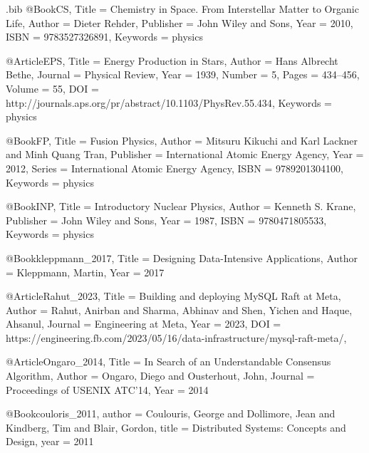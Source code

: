 \RequirePackage{filecontents}
\begin{filecontents*}{\jobname.bib}
@Book{CS,
  Title                    = {Chemistry in Space. From Interstellar Matter to Organic Life},
  Author                   = {Dieter Rehder},
  Publisher                = {John Wiley and Sons},
  Year                     = {2010},
  ISBN                     = {9783527326891},
  Keywords                 = {physics}
}

@Article{EPS,
  Title                    = {Energy Production in Stars},
  Author                   = {Hans Albrecht Bethe},
  Journal                  = {Physical Review},
  Year                     = {1939},
  Number                   = {5},
  Pages                    = {434--456},
  Volume                   = {55},
  DOI                      = {http://journals.aps.org/pr/abstract/10.1103/PhysRev.55.434},
  Keywords                 = {physics}
}

@Book{FP,
  Title                    = {Fusion Physics},
  Author                   = {Mitsuru Kikuchi and Karl Lackner and Minh Quang Tran},
  Publisher                = {International Atomic Energy Agency},
  Year                     = {2012},
  Series                   = {International Atomic Energy Agency},
  ISBN                     = {9789201304100},
  Keywords                 = {physics}
}

@Book{INP,
  Title                    = {Introductory Nuclear Physics},
  Author                   = {Kenneth S. Krane},
  Publisher                = {John Wiley and Sons},
  Year                     = {1987},
  ISBN                     = {9780471805533},
  Keywords                 = {physics}
}

@Book{kleppmann_2017,
  Title                    = {Designing Data-Intensive Applications},
  Author                   = {Kleppmann, Martin},
  Year                     = {2017}
}

@Article{Rahut_2023,
  Title                    = {Building and deploying MySQL Raft at Meta},
  Author                   = {Rahut, Anirban and Sharma, Abhinav and Shen, Yichen and Haque, Ahsanul},
  Journal                  = {Engineering at Meta},
  Year                     = {2023},
  DOI                      = {https://engineering.fb.com/2023/05/16/data-infrastructure/mysql-raft-meta/},
}

@Article{Ongaro_2014,
  Title                    = {In Search of an Understandable Consensus Algorithm},
  Author                   = {Ongaro, Diego and Ousterhout, John},
  Journal                  = {Proceedings of USENIX ATC'14},
  Year                     = {2014}
}

@Book{couloris_2011,
author = {Coulouris, George and Dollimore, Jean and Kindberg, Tim and Blair, Gordon},
title = {Distributed Systems: Concepts and Design},
year = {2011}
}



\end{filecontents*}



